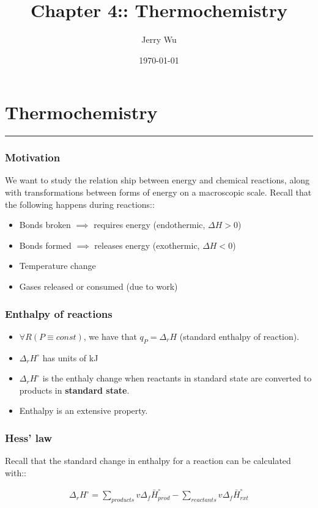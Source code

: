 \documentclass[12pt]{book}
\title{Chapter 4:: Thermochemistry}
\author{Jerry Wu}
\date{\today}
\begin{document}
\maketitle
\chapter*{Thermochemistry}
\rule{\textwidth}{0.4pt}

\subsection*{Motivation}
We want to study the relation ship between energy and chemical reactions, along with transformations between forms of energy on a macroscopic scale. Recall that the following happens during reactions::

\begin{itemize}
    \item Bonds broken $\implies$ requires energy (endothermic, $\Delta H>0$)
    \item Bonds formed $\implies$ releases energy (exothermic, $\Delta H<0$)
    \item Temperature change
    \item Gases released or consumed (due to work)
\end{itemize}

\subsection*{Enthalpy of reactions}
\begin{itemize}
    \item $\forall R(P\equiv const)$, we have that $q_P=\Delta_r H$ (standard enthalpy of reaction).
    \item $\Delta_r H^{\circ}$ has units of kJ
    \item $\Delta_r H^{\circ}$ is the enthaly change when reactants in standard state are converted to products in \textbf{standard state}.
    \item Enthalpy is an extensive property.
\end{itemize}

\subsection*{Hess' law}

Recall that the standard change in enthalpy for a reaction can be calculated with::

\begin{align*}
    \Delta_r H^{\circ}=\sum_{products} v\Delta_f \bar{H}^{\circ}_{prod}-\sum_{reactants} v\Delta_f \bar{H}^{\circ}_{rxt}
\end{align*}
\end{document}

